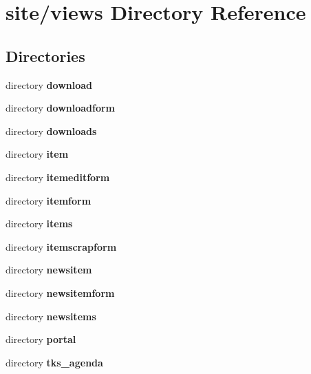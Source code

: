 \section{site/views Directory Reference}
\label{dir_68be45116affbde0fa34d864e6eeca94}
\subsection*{Directories}
\begin{DoxyCompactItemize}
\item 
directory \textbf{ download}
\item 
directory \textbf{ downloadform}
\item 
directory \textbf{ downloads}
\item 
directory \textbf{ item}
\item 
directory \textbf{ itemeditform}
\item 
directory \textbf{ itemform}
\item 
directory \textbf{ items}
\item 
directory \textbf{ itemscrapform}
\item 
directory \textbf{ newsitem}
\item 
directory \textbf{ newsitemform}
\item 
directory \textbf{ newsitems}
\item 
directory \textbf{ portal}
\item 
directory \textbf{ tks\+\_\+agenda}
\end{DoxyCompactItemize}
